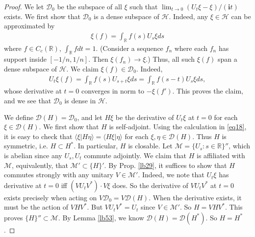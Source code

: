 \documentclass[12pt,b5paper,notitlepage]{article}
\theoremstyle{definition}
\theoremstyle{plain}
\newcommand{\mc}{\mathcal}
\newcommand{\Dom}{\scr D}
\newcommand{\bk}[1]{\langle {#1}\rangle}
\newcommand{\scr}{\mathscr}
\newcommand{\im}{\mathbf{i}}
\newcommand{\Rbb}{\mathbb R}
\numberwithin{equation}{section}
\begin{document}
\begin{proof}
We let $\Dom_0$ be the subspace of all $\xi$ such that $\lim_{t\rightarrow 0}(U_t\xi-\xi)/(\im t)$ exists. We first show that $\Dom_0$ is a dense subspace of $\mc H$. Indeed, any $\xi\in\mc H$ can be approximated by
\begin{align*}
\xi(f)=\int_\Rbb f(s)U_s\xi ds	
\end{align*}
where $f\in C_c(\Rbb)$,  $\int_\Rbb fdt=1$. (Consider a sequence $f_n$ where each $f_n$ has support inside $[-1/n,1/n]$. Then $\xi(f_n)\rightarrow\xi$.) Thus, all such $\xi(f)$ span a dense subspace of $\mc H$. We claim $\xi(f)\in\Dom_0$. Indeed,
\begin{align*}
U_t\xi(f)=\int_\Rbb f(s)U_{s+t}\xi ds=\int_\Rbb f(s-t)U_s\xi ds,	
\end{align*}
whose derivative at $t=0$ converges in norm to $-\xi(f')$. This proves the claim, and we see that $\Dom_0$ is dense in $\mc H$.

We define $\Dom(H)=\Dom_0$, and let $H\xi$ be the derivative of $U_t\xi$ at $t=0$ for each $\xi\in\Dom(H)$. We first show that $H$ is self-adjoint. Using the calculation in \eqref{eq18}, it is easy to check that $\bk{\xi|H\eta}=\bk{H\xi|\eta}$ for each $\xi,\eta\in\Dom(H)$. Thus $H$ is symmetric, i.e. $H\subset H^*$. In particular, $H$ is closable. Let $\mc M=\{U_s:s\in\Rbb\}''$, which is abelian since any $U_s,U_t$ commute adjointly. We claim that $H$ is affiliated with $\mc M$, equivalently, that $\mc M'\subset\{H\}'$. By Prop. \ref{lb29}, it suffices to show that $H$ commutes strongly with any unitary $V\in\mc M'$. Indeed, we note that $U_t\xi$ has derivative at $t=0$ iff $(VU_tV^*)\cdot V\xi$ does. So the derivative of $VU_tV^*$ at $t=0$ exists precisely when acting on $V\Dom_0=V\Dom(H)$. When the derivative exists, it must be the action of $VHV^*$. But $VU_tV^*=U_t$ since $V\in\mc M'$. So $H=VHV^*$. This proves $\{H\}''\subset\mc M$. By Lemma \ref{lb53}, we know $\Dom(H)=\Dom(H^*)$. So $H=H^*$.


\end{proof}
\end{document}
